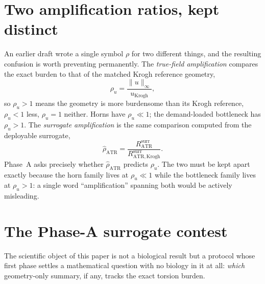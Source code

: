 \documentclass[11pt]{article}
\theoremstyle{remark}
\newcommand{\rhou}{\rho_u}
\newcommand{\rhohat}{\hat\rho_{\mathrm{ATR}}}
\newcommand{\norminf}[1]{\lVert#1\rVert_{\infty}}
\begin{document}
\section{Two amplification ratios, kept distinct}\label{sec:ratios}

An earlier draft wrote a single symbol $\rho$ for two different things, and the
resulting confusion is worth preventing permanently. The \emph{true-field
amplification} compares the exact burden to that of the matched Krogh reference
geometry,
\begin{equation}\label{eq:rhou}
\rhou=\frac{\norminf{u}}{u_{\mathrm{Krogh}}},
\end{equation}
so $\rhou>1$ means the geometry is more burdensome than its Krogh reference,
$\rhou<1$ less, $\rhou=1$ neither. Horns have $\rhou\ll1$; the demand-loaded
bottleneck has $\rhou>1$. The \emph{surrogate amplification} is the same
comparison computed from the deployable surrogate,
\begin{equation}\label{eq:rhohat}
\rhohat=\frac{R^{\text{surr}}_{\mathrm{ATR}}}{R^{\text{surr}}_{\mathrm{ATR,Krogh}}}.
\end{equation}
Phase~A asks precisely whether $\rhohat$ predicts $\rhou$. The two must be kept
apart exactly because the horn family lives at $\rhou\ll1$ while the bottleneck
family lives at $\rhou>1$: a single word ``amplification'' spanning both would be
actively misleading.

\section{The Phase-A surrogate contest}\label{sec:phaseA}

The scientific object of this paper is not a biological result but a protocol
whose first phase settles a mathematical question with no biology in it at all:
\emph{which} geometry-only summary, if any, tracks the exact torsion burden.
\end{document}
